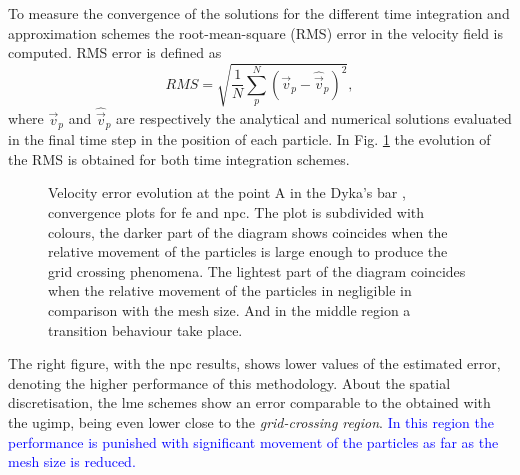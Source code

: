 \documentclass[preprint,12pt,a4paper]{elsarticle}
\begin{document}
To measure the convergence of the solutions
for the different time integration and approximation schemes the
root-mean-square (RMS) error in the velocity field is computed. RMS
error is defined as
\begin{equation}
  \label{eq:RMS}
  RMS = \sqrt{\frac{1}{N} \sum^{N}_p \left( \vec{v}_p - \hat{\vec{v}}_p \right)^2},
\end{equation}
where $\vec{v}_p$ and $\hat{\vec{v}}_p$ are respectively the analytical and
numerical solutions evaluated in the final time step in the position
of each particle. In Fig. \ref{fig:Dyka-error-evol} the evolution of the RMS is obtained for both time integration schemes. 
\begin{figure}
  \centering
  \caption{Velocity error evolution at the point A in the Dyka's bar ,
    convergence plots for \acrshort{fe} and \acrshort{npc}. The plot is subdivided with
    colours, the darker part of the diagram shows coincides when the
    relative movement of the particles is large enough to produce the
    grid crossing phenomena. The lightest part of the diagram
    coincides when the relative movement of the particles in
    negligible in comparison with the mesh size. And in the middle
    region a transition behaviour take place.}
  \label{fig:Dyka-error-evol}
\end{figure}
The right figure, with the \acrshort{npc} results, shows lower values of the estimated error, denoting the higher performance of this methodology. About the spatial discretisation, the \acrshort{lme} schemes show an error comparable to the obtained with the \acrshort{ugimp}, being even lower close to the \textit{grid-crossing region}. \textcolor{blue}{In this region the performance is punished with significant movement of the particles as far as the mesh size is reduced.}
\end{document}
